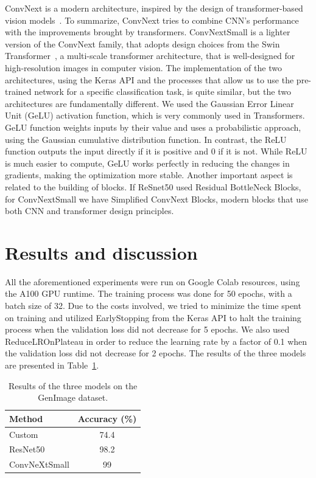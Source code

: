 \documentclass[runningheads]{llncs}
\begin{document}
ConvNext is a modern architecture, inspired by the design of transformer-based vision models~\cite{liu2022convnet}. To summarize, ConvNext tries to combine CNN's performance with the improvements brought by transformers. ConvNextSmall is a lighter version of the ConvNext family, that adopts design choices from the Swin Transformer~\cite{liu2021swin}, a multi-scale transformer architecture, that is well-designed for high-resolution images in computer vision. The implementation of the two architectures, using the Keras API and the processes that allow us to use the pre-trained network for a specific classification task,  is quite similar, but the two architectures are fundamentally different. We used the Gaussian Error Linear Unit (GeLU) activation function, which is very commonly used in Transformers. GeLU function weights inputs by their value and uses a probabilistic approach, using the Gaussian cumulative distribution function. In contrast, the ReLU function outputs the input directly if it is positive and 0 if it is not. While ReLU is much easier to compute, GeLU works perfectly in reducing the changes in gradients, making the optimization more stable. Another important aspect is related to the building of blocks. If ReSnet50 used Residual BottleNeck Blocks, for ConvNextSmall we have Simplified ConvNext Blocks, modern blocks that use both CNN and transformer design principles.

%
%
\section{Results and discussion}
All the aforementioned experiments were run on Google Colab resources, using the A100 GPU runtime. The training process was done for 50 epochs, with a batch size of 32. Due to the costs involved, we tried to minimize the time spent on training and utilized EarlyStopping from the Keras API to halt the training process when the validation loss did not decrease for 5 epochs. We also used ReduceLROnPlateau in order to reduce the learning rate by a factor of 0.1 when the validation loss did not decrease for 2 epochs. The results of the three models are presented in Table~\ref{tab:simpleresults}.

\begin{table}
    \centering
    \caption{Results of the three models on the GenImage dataset.}\label{tab1}
    \begin{tabular}{l|c}
    \hline
    Method & Accuracy (\%) \\
    \hline
    Custom &  74.4 \\
    ResNet50 & 98.2 \\
    ConvNeXtSmall & 99 \\
    \hline
    \end{tabular}
    \label{tab:simpleresults}
\end{table}
\end{document}
